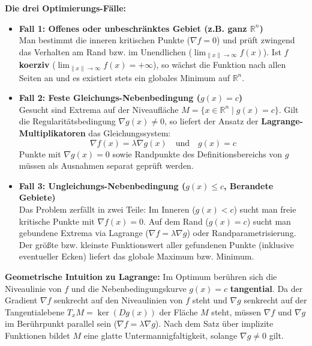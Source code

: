 \begin{important}
    \textbf{Die drei Optimierungs-Fälle:}
    \begin{itemize}
        \item \textbf{Fall 1: Offenes oder unbeschränktes Gebiet (z.B. ganz $\mathbb{R}^n$)} \\
        Man bestimmt die inneren kritischen Punkte ($\nabla f = 0$) und prüft zwingend das Verhalten am Rand bzw. im Unendlichen ($\lim_{\|x\|\to\infty} f(x)$). Ist $f$ \textbf{koerziv} ($\lim_{\|x\|\to\infty} f(x) = +\infty$), so wächst die Funktion nach allen Seiten an und es existiert stets ein globales Minimum auf $\mathbb{R}^n$.
        
        \item \textbf{Fall 2: Feste Gleichungs-Nebenbedingung ($g(x) = c$)} \\
        Gesucht sind Extrema auf der Niveaufläche $M = \{x \in \mathbb{R}^n \mid g(x) = c\}$. Gilt die Regularitätsbedingung $\nabla g(x) \neq 0$, so liefert der Ansatz der \textbf{Lagrange-Multiplikatoren} das Gleichungssystem:
        $$ \nabla f(x) = \lambda \nabla g(x) \quad \text{und} \quad g(x) = c $$
        Punkte mit $\nabla g(x) = 0$ sowie Randpunkte des Definitionsbereichs von $g$ müssen als Ausnahmen separat geprüft werden.
        
        \item \textbf{Fall 3: Ungleichungs-Nebenbedingung ($g(x) \le c$, Berandete Gebiete)} \\
        Das Problem zerfällt in zwei Teile: Im Inneren ($g(x) < c$) sucht man freie kritische Punkte mit $\nabla f(x) = 0$. Auf dem Rand ($g(x) = c$) sucht man gebundene Extrema via Lagrange ($\nabla f = \lambda \nabla g$) oder Randparametrisierung. Der größte bzw. kleinste Funktionswert aller gefundenen Punkte (inklusive eventueller Ecken) liefert das globale Maximum bzw. Minimum.
    \end{itemize}
\end{important}

\begin{remark}
    \textbf{Geometrische Intuition zu Lagrange:}
    Im Optimum berühren sich die Niveaulinie von $f$ und die Nebenbedingungskurve $g(x) = c$ \textbf{tangential}. Da der Gradient $\nabla f$ senkrecht auf den Niveaulinien von $f$ steht und $\nabla g$ senkrecht auf der Tangentialebene $T_x M = \ker(Dg(x))$ der Fläche $M$ steht, müssen $\nabla f$ und $\nabla g$ im Berührpunkt parallel sein ($\nabla f = \lambda \nabla g$). Nach dem Satz über implizite Funktionen bildet $M$ eine glatte Untermannigfaltigkeit, solange $\nabla g \neq 0$ gilt.
\end{remark}

